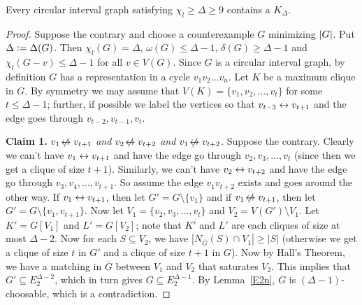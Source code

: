 \begin{lem}\label{CircularIntervalLemma}
Every circular interval graph satisfying $\chi_l \ge \Delta \ge 9$ contains a
$K_\Delta$.
\end{lem}
\begin{proof}
Suppose the contrary and choose a counterexample $G$ minimizing $\left|G\right|$.  Put
$\Delta \mathrel{\mathop:}= \Delta(G)$. Then $\chi_l(G)=\Delta$, $\omega(G)\le \Delta-1$,
$\delta(G)\ge \Delta-1$ and $\chi_l(G-v)\le \Delta-1$ for all $v\in V(G)$. 
Since $G$ is a circular interval graph, by definition $G$ has a representation
in a cycle $v_1v_2\ldots v_n$.  Let $K$ be a maximum clique in $G$.  By symmetry we may assume that
$V(K)=\{v_1,v_2,\ldots,v_t\}$ for some $t\le \Delta-1$; further, if possible we
label the vertices so that $v_{t-3}\leftrightarrow v_{t+1}$ and the edge goes through
$v_{t-2},v_{t-1},v_t$.

\textbf{Claim 1.} \textit{$v_1\not\!\leftrightarrow v_{t+1}$ and $v_2\not\!\leftrightarrow v_{t+2}$ and
$v_1\not\!\leftrightarrow v_{t+2}$}. 
Suppose the contrary.
Clearly we can't have $v_1\leftrightarrow v_{t+1}$ and have the edge go through
$v_2,v_3,\ldots, v_t$ (since then we get a clique of size $t+1$).
Similarly, we can't have $v_2\leftrightarrow v_{t+2}$ and have the edge go through
$v_3,v_4,\ldots,v_{t+1}$.  So assume the edge $v_1v_{t+2}$ exists and 
goes around the other way.
If $v_1\leftrightarrow v_{t+1}$, then let $G'=G\setminus \{v_1\}$ and if $v_1\not\!\leftrightarrow
v_{t+1}$, then let $G'=G\setminus \{v_1,v_{t+1}\}$.  Now let
$V_1=\{v_2,v_3,\ldots,v_t\}$ and $V_2=V(G')\setminus V_1$.  Let $K'=G[V_1]$ and
$L'=G[V_2]$; note that $K'$ and $L'$ are each cliques of size at most
$\Delta-2$.  Now for each $S\subseteq V_2$,
we have $|N_{\overline{G}}(S)\cap V_1|\ge |S|$
(otherwise we get a clique of size $t$ in $G'$ and a clique of size $t+1$ in $G$).  Now by Hall's Theorem, we have a matching in $\overline{G}$ between $V_1$
and $V_2$ that saturates $V_2$.  This implies that $G'\subseteq E_2^{\Delta-2}$,
which in turn gives $G\subseteq E_2^{\Delta-1}$.  By Lemma~\ref{E2n}, $G$ is
$(\Delta-1)$-choosable, which is a contradiction.


\end{proof}
